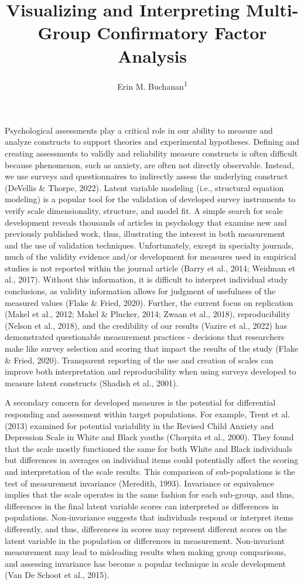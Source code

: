 \documentclass[
  man]{apa7}
\title{Visualizing and Interpreting Multi-Group Confirmatory Factor Analysis}
\author{Erin M. Buchanan\textsuperscript{1}}
\date{}
\affiliation{\vspace{0.5cm}\textsuperscript{1} Harrisburg University of Science and Technology}
\begin{document}
\maketitle

Psychological assessments play a critical role in our ability to measure and analyze constructs to support theories and experimental hypotheses. Defining and creating assessments to validly and reliability measure constructs is often difficult because phenomenon, such as anxiety, are often not directly observable. Instead, we use surveys and questionnaires to indirectly assess the underlying construct (DeVellis \& Thorpe, 2022). Latent variable modeling (i.e., structural equation modeling) is a popular tool for the validation of developed survey instruments to verify scale dimensionality, structure, and model fit. A simple search for scale development reveals thousands of articles in psychology that examine new and previously published work, thus, illustrating the interest in both measurement and the use of validation techniques. Unfortunately, except in specialty journals, much of the validity evidence and/or development for measures used in empirical studies is not reported within the journal article (Barry et al., 2014; Weidman et al., 2017). Without this information, it is difficult to interpret individual study conclusions, as validity information allows for judgment of usefulness of the measured values (Flake \& Fried, 2020). Further, the current focus on replication (Makel et al., 2012; Makel \& Plucker, 2014; Zwaan et al., 2018), reproducibility (Nelson et al., 2018), and the credibility of our results (Vazire et al., 2022) has demonstrated questionable measurement practices - decisions that researchers make like survey selection and scoring that impact the results of the study (Flake \& Fried, 2020). Transparent reporting of the use and creation of scales can improve both interpretation and reproducibility when using surveys developed to measure latent constructs (Shadish et al., 2001).

A secondary concern for developed measures is the potential for differential responding and assessment within target populations. For example, Trent et al. (2013) examined for potential variability in the Revised Child Anxiety and Depression Scale in White and Black youths (Chorpita et al., 2000). They found that the scale mostly functioned the same for both White and Black individuals but differences in averages on individual items could potentially affect the scoring and interpretation of the scale results. This comparison of sub-populations is the test of measurement invariance (Meredith, 1993). Invariance or equivalence implies that the scale operates in the same fashion for each sub-group, and thus, differences in the final latent variable scores can interpreted as differences in populations. Non-invariance suggests that individuals respond or interpret items differently, and thus, differences in scores may represent different scores on the latent variable in the population or differences in measurement. Non-invariant measurement may lead to misleading results when making group comparisons, and assessing invariance has become a popular technique in scale development (Van De Schoot et al., 2015).
\end{document}
